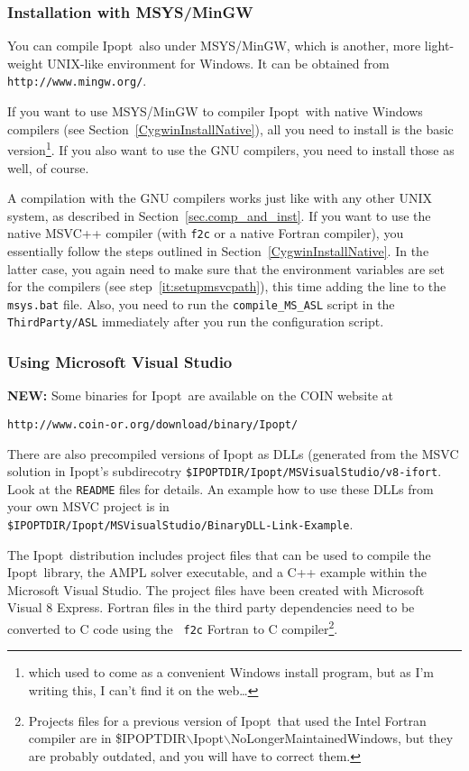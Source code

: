 \documentclass[10pt]{article}
\newcommand{\Ipopt}{{\sc Ipopt}}
\begin{document}
\subsubsection{Installation with MSYS/MinGW}\label{MinGWInstall}

You can compile \Ipopt\ also under MSYS/MinGW, which is another, more
light-weight UNIX-like environment for Windows.  It can be obtained
from \texttt{http://www.mingw.org/}.

If you want to use MSYS/MinGW to compiler \Ipopt\ with native Windows
compilers (see Section~\ref{CygwinInstallNative}), all you need to
install is the basic version\footnote{which used to come as a
  convenient Windows install program, but as I'm writing this, I can't
  find it on the web\ldots}.  If you also want to use the GNU
compilers, you need to install those as well, of course.

A compilation with the GNU compilers works just like with any other
UNIX system, as described in Section~\ref{sec.comp_and_inst}.  If you
want to use the native MSVC++ compiler (with {\tt f2c} or a native
Fortran compiler), you essentially follow the steps outlined in
Section~\ref{CygwinInstallNative}.  In the latter case, you again need
to make sure that the environment variables are set for the compilers
(see step~\ref{it:setupmsvcpath}), this time adding the line to the
{\tt msys.bat} file.  Also, you need to run the
\texttt{compile\_MS\_ASL} script in the \texttt{ThirdParty/ASL}
immediately after you run the configuration script.

\subsubsection{Using Microsoft Visual Studio}\label{VisualStudioInstall}

\textbf{NEW:} Some binaries for \Ipopt\ are available on the COIN website at

\texttt{http://www.coin-or.org/download/binary/Ipopt/}

\noindent
There are also precompiled versions of Ipopt as DLLs (generated from
the MSVC solution in \Ipopt's subdirecotry
\texttt{\$IPOPTDIR/Ipopt/MSVisualStudio/v8-ifort}.  Look at the
\texttt{README} files for details.  An example how to use these DLLs
from your own MSVC project is in\\
\texttt{\$IPOPTDIR/Ipopt/MSVisualStudio/BinaryDLL-Link-Example}.

The \Ipopt\ distribution includes project files that can be used to
compile the \Ipopt\ library, the AMPL solver executable, and a C++
example within the Microsoft Visual Studio.  The project files have
been created with Microsoft Visual 8 Express.  Fortran files in the
third party dependencies need to be converted to C code using the {\tt
  f2c} Fortran to C compiler\footnote{Projects files for a previous
  version of \Ipopt\ that used the Intel Fortran compiler are in
  {\$IPOPTDIR$\backslash$Ipopt$\backslash$NoLongerMaintainedWindows},
  but they are probably outdated, and you will have to correct them.}.
\end{document}
